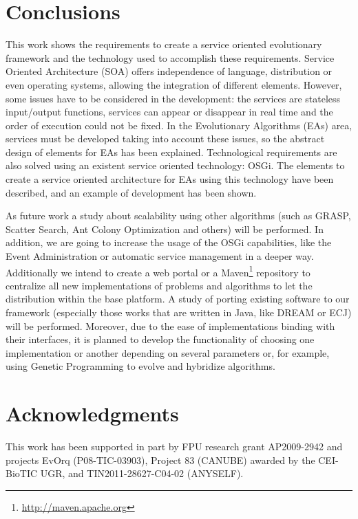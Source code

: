 \documentclass{sig-alternate}
\begin{document}
\section{Conclusions}
\label{sec:conclusions}
This work shows the requirements to create a service oriented evolutionary framework and the technology used to accomplish these requirements. Service Oriented Architecture (SOA) offers independence of language, distribution or even operating systems, allowing the integration of different elements. However, some issues have to be considered in the development: the services are stateless input/output functions, services can appear or disappear in real time and the order of execution could not be fixed. In the Evolutionary Algorithms (EAs) area, services must be developed taking into account these issues, so the abstract design of elements for EAs has been explained. Technological requirements are also solved using an existent service oriented technology: OSGi. The elements to create a service oriented architecture for EAs using this technology have been described, and an example of development has been shown.

As future work a study about scalability using other algorithms (such as GRASP, Scatter Search, Ant Colony Optimization and others) will be performed. In addition, we are going to increase the usage of the OSGi capabilities, like the Event Administration or automatic service management in a deeper way.
Additionally we intend to create a web portal or a Maven\footnote{\url{http://maven.apache.org}} repository to centralize all new implementations of problems and algorithms to let the distribution within the base platform. A study of porting existing software to our framework (especially those works that are written in Java, like DREAM or ECJ) will be performed. Moreover, due to the ease of implementations binding with their interfaces, it is planned to develop the functionality of choosing one implementation or another depending on several parameters or, for example, using Genetic Programming to evolve and hybridize algorithms.

\section{Acknowledgments}
This work has been supported in part by FPU research grant AP2009-2942 and projects EvOrq (P08-TIC-03903), Project 83 (CANUBE) awarded by the CEI-BioTIC UGR, and TIN2011-28627-C04-02 (ANYSELF).
\end{document}
